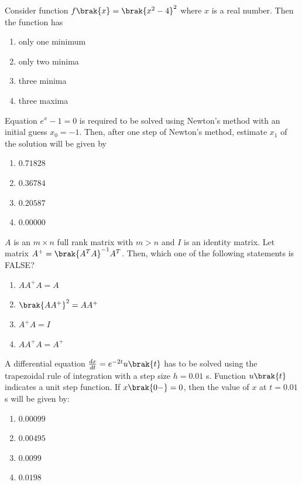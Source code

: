     \item Consider function $f\brak{x} = \brak{x^2 - 4}^2$ where $x$ is a real number. Then the function has 
        \begin{enumerate}
            \item only one minimum
            \item only two minima
            \item three minima
            \item three maxima
        \end{enumerate}

    \item Equation $e^x - 1 = 0$ is required to be solved using Newton's method with an initial guess $x_0 = -1$. Then, after one step of Newton's method, estimate $x_1$ of the solution will be given by  

        \begin{enumerate}
            \item $0.71828$
            \item $0.36784$
            \item $0.20587$
            \item $0.00000$
        \end{enumerate}

    \item $A$ is an $m \times n$ full rank matrix with $m > n$ and $I$ is an identity matrix. Let matrix $A^+ = \brak{A^T A}^{-1} A^T$. Then, which one of the following statements is FALSE?
        \begin{enumerate}
            \item $AA^+A = A$
            \item $\brak{AA^+}^2 = AA^+$
            \item $A^+A = I$
            \item $AA^+A = A^+$
        \end{enumerate}

    \item A differential equation $\frac{dx}{dt} = e^{-2t}u\brak{t}$ has to be solved using the trapezoidal rule of integration with a step size $h = 0.01$ s. Function $u\brak{t}$ indicates a unit step function. If $x\brak{0-} = 0$, then the value of $x$ at $t = 0.01$ s will be given by:
        \begin{enumerate}
            \item $0.00099$
            \item $0.00495$
            \item $0.0099$
            \item $0.0198$
        \end{enumerate}

